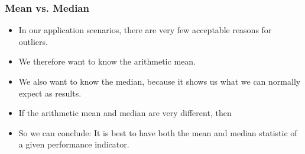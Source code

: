 \documentclass[mathserif]{beamer}%
\begin{document}
%
\begin{frame}%
\frametitle{Mean vs. Median}%
\begin{itemize}%
\item In our application scenarios, there are very few acceptable reasons for outliers.%
\item<2-> We therefore want to know the arithmetic mean.%
\item<3-> We also want to know the median, because it shows us what we can normally expect as results.%
\item<4-> If the arithmetic mean and median are very different, then%
\item<7-> So we can conclude: It is best to have both the mean and median statistic of a given performance indicator.%
\end{itemize}%
%
\end{frame}%
%
\end{document}
